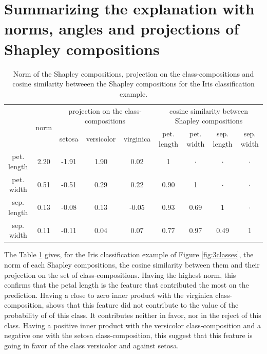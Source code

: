 \documentclass{article}
\theoremstyle{plain}
\theoremstyle{definition}
\theoremstyle{remark}
\begin{document}
\newpage
\section{Summarizing the explanation with norms, angles and projections of Shapley compositions}
\label{app:summarize}

\begin{table}
  \centering
  \caption{Norm of the Shapley compositions, projection on the class-compositions and cosine similarity betweeen the Shapley compositions for the Iris classification example.}
  \begin{tabular}{c|c|ccc|cccc|}
    \cline{2-9}
    & \multirow{2}{*}{norm} & \multicolumn{3}{c|}{projection on the class-compositions} & \multicolumn{4}{c|}{cosine similarity between Shapley compositions} \\
    \cline{3-9}
     & & \small setosa & \small versicolor & \small virginica & \small pet. length & \small pet. width & \small sep. length & \small sep. width \\
    \hline
    \small pet. length & 2.20  & -1.91 & 1.90 & 0.02 & 1 &$\cdot$ &$\cdot$ &$\cdot$ \\
    \small pet. width & 0.51 & -0.51 & 0.29 & 0.22 & 0.90 & 1 &$\cdot$ &$\cdot$ \\
    \small sep. length & 0.13 & -0.08 & 0.13 & -0.05 & 0.93 & 0.69 & 1 &$\cdot$ \\
    \small sep. width & 0.11 & -0.11 & 0.04 & 0.07 & 0.77 & 0.97 & 0.49 &1 \\
    \hline
  \end{tabular}
  \label{tab:normiris}
\end{table}
The Table \ref{tab:normiris} gives, for the Iris classification example of Figure \ref{fig:3classes}, the norm of each Shapley compositions, the cosine similarity between them and their projection on the set of class-compositions. Having the highest norm, this confirms that the petal length is the feature that contributed the most on the prediction. Having a close to zero inner product with the virginica class-composition, shows that this feature did not contribute to the value of the probability of of this class. It contributes neither in favor, nor in the reject of this class. Having a positive inner product with the versicolor class-composition and a negative one with the setosa class-composition, this suggest that this feature is going in favor of the class versicolor and against setosa.
\end{document}
